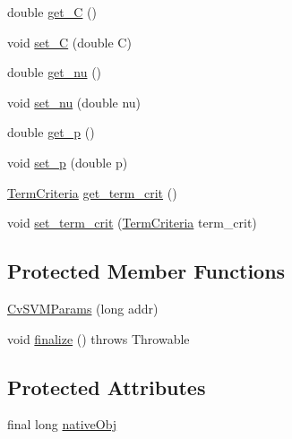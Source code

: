 \begin{DoxyCompactItemize}
\item 
double \mbox{\hyperlink{classorg_1_1opencv_1_1ml_1_1_cv_s_v_m_params_a832679b4a38980b22d7833fba90b04d9}{get\+\_\+C}} ()
\item 
void \mbox{\hyperlink{classorg_1_1opencv_1_1ml_1_1_cv_s_v_m_params_a5cb0a2b57c9cbc5e827403ef75899cdf}{set\+\_\+C}} (double C)
\item 
double \mbox{\hyperlink{classorg_1_1opencv_1_1ml_1_1_cv_s_v_m_params_a1bb2c98f9fcd23815d90ff73da8e7d27}{get\+\_\+nu}} ()
\item 
void \mbox{\hyperlink{classorg_1_1opencv_1_1ml_1_1_cv_s_v_m_params_abd0ce80f00d1317cac234cc4e06c9a7a}{set\+\_\+nu}} (double nu)
\item 
double \mbox{\hyperlink{classorg_1_1opencv_1_1ml_1_1_cv_s_v_m_params_a52d8b3e08a0cf7141fe5973610768d3c}{get\+\_\+p}} ()
\item 
void \mbox{\hyperlink{classorg_1_1opencv_1_1ml_1_1_cv_s_v_m_params_ae64defdd3ff9d09861520af823b611e7}{set\+\_\+p}} (double p)
\item 
\mbox{\hyperlink{classorg_1_1opencv_1_1core_1_1_term_criteria}{Term\+Criteria}} \mbox{\hyperlink{classorg_1_1opencv_1_1ml_1_1_cv_s_v_m_params_a128830b594a7165a6f0750ebd37f80d4}{get\+\_\+term\+\_\+crit}} ()
\item 
void \mbox{\hyperlink{classorg_1_1opencv_1_1ml_1_1_cv_s_v_m_params_a41fe4b04f6a9774bbd16c303a30f0f99}{set\+\_\+term\+\_\+crit}} (\mbox{\hyperlink{classorg_1_1opencv_1_1core_1_1_term_criteria}{Term\+Criteria}} term\+\_\+crit)
\end{DoxyCompactItemize}
\subsection*{Protected Member Functions}
\begin{DoxyCompactItemize}
\item 
\mbox{\hyperlink{classorg_1_1opencv_1_1ml_1_1_cv_s_v_m_params_ae098dd5eff6677f8328c6cf3b0871264}{Cv\+S\+V\+M\+Params}} (long addr)
\item 
void \mbox{\hyperlink{classorg_1_1opencv_1_1ml_1_1_cv_s_v_m_params_ad54df77ed42677c82b3940f65862f51b}{finalize}} ()  throws Throwable 
\end{DoxyCompactItemize}
\subsection*{Protected Attributes}
\begin{DoxyCompactItemize}
\item 
final long \mbox{\hyperlink{classorg_1_1opencv_1_1ml_1_1_cv_s_v_m_params_a2b6bd458876048039fd8816de90f9a4c}{native\+Obj}}
\end{DoxyCompactItemize}


